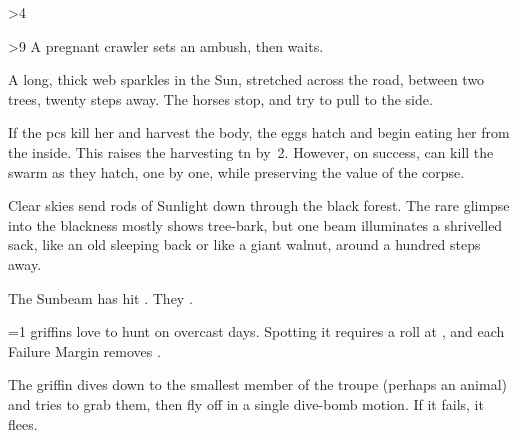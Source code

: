 \ifnum\value{cycle}>4

  \ifnum\value{r12}>9%
    A pregnant \gls{crawler} sets an ambush, then waits.


    \begin{boxtext}
      A long, thick web sparkles in the Sun, stretched across the road, between two trees, twenty \glspl{step} away.
      The horses stop, and try to pull to the side.
    \end{boxtext}

    If the \glspl{pc} kill her and harvest the body, the eggs hatch and begin eating her from the inside.
    This raises the \gls{harvesting} \gls{tn} by~2.
    However, on success,  can kill the swarm as they hatch, one by one, while preserving the value of the corpse.

    \crawlerSwarm

  \else%
    \begin{boxtext}
      Clear skies send rods of Sunlight down through the black forest.
      The rare glimpse into the blackness mostly shows tree-bark, but one beam illuminates a shrivelled sack, like an old sleeping back or like a giant walnut, around a hundred \glspl{step} away.
    \end{boxtext}

    The Sunbeam has hit .
    They .

  \fi

\else
  \ifnum\value{temperature}=1
    \Glspl{griffin} love to hunt on overcast days.
    Spotting it requires a  roll at \tn[12], and each Failure Margin removes .


    The \gls{griffin} dives down to the smallest member of the troupe (perhaps an animal) and tries to grab them, then fly off in a single dive-bomb motion.
    If it fails, it flees.

  \fi

\fi

